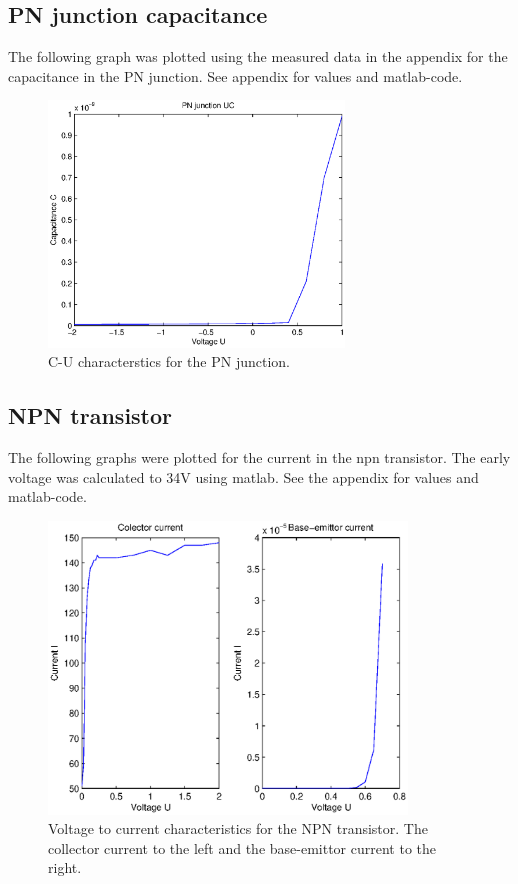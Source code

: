 \documentclass[a4paper]{article}
\begin{document}
\subsection{PN junction capacitance}
The following graph was plotted using the measured data in the appendix for the capacitance in the PN junction. See appendix for values and matlab-code. 
\begin{figure}[H]
	\centering
	\includegraphics[width=0.7\textwidth]{pn_cap.eps}
	\caption{C-U characterstics for the PN junction.}	
	\label{pn_cap}
\end{figure}

\subsection{NPN transistor}
The following graphs were plotted for the current in the npn transistor. The early voltage was calculated to 34V using matlab. See the appendix for values and matlab-code.
\begin{figure}[H]
	\centering
	\includegraphics[width=0.85\textwidth]{npn.eps}
	\caption{Voltage to current characteristics for the NPN transistor. The collector current to the left and the base-emittor current to the right.}	
	\label{npn}
\end{figure}
\end{document}
